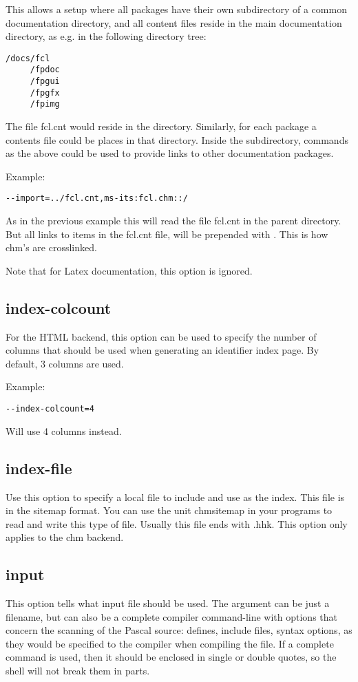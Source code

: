 This allows a setup where all packages have their own subdirectory of a
common documentation directory, and all content files reside in the main
documentation directory, as e.g. in the following directory tree:
\begin{verbatim}
/docs/fcl
     /fpdoc
     /fpgui
     /fpgfx
     /fpimg
\end{verbatim}
The file fcl.cnt would reside in the  directory. Similarly, for
each package a contents file  could be places in that
directory. Inside the subdirectory, commands as the above could be used to
provide links to other documentation packages.

Example:
\begin{verbatim}
--import=../fcl.cnt,ms-its:fcl.chm::/
\end{verbatim}
As in the previous example this will read the file fcl.cnt in the parent 
directory. But all links to items in the fcl.cnt file, will be prepended 
with . This is how chm's are crosslinked.

Note that for Latex documentation, this option is ignored.

\subsection{index-colcount}
\label{suse:index-file}
For the HTML backend, this option can be used to specify the number of
columns that should be used when generating an identifier index page.
By default, 3 columns are used.

Example:
\begin{verbatim}
--index-colcount=4
\end{verbatim}
Will use 4 columns instead.

\subsection{index-file}
\label{suse:index-file}
Use this option to specify a local file to include and use as the index. This 
file is in the sitemap format. You can use the unit chmsitemap in your 
programs to read and write this type of file. Usually this file ends with .hhk. 
This option only applies to the chm backend.

\subsection{input}
\label{suse:input}
This option tells \fpdoc what input file should be used. The argument can 
be just a filename, but can also be a complete compiler command-line with 
options that concern the scanning of the Pascal source: defines, include 
files, syntax options,  as they would be specified to the \fpc compiler 
when compiling the file. If a complete command is used, then it should be 
enclosed in single or double quotes, so the shell will not break them in 
parts.

